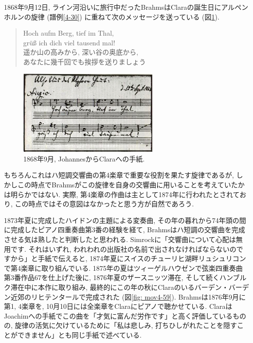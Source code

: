 1868年9月12日, ライン河沿いに旅行中だったBrahms\cite{compos}はClaraの誕生日にアルペンホルンの旋律
(譜例\ref{4-30}) に重ねて次のメッセージを送っている (図\ref{fig: alphorn}).
\begin{quote}
\begin{multicols}{2}
	Hoch aufm Berg, tief im Thal, \\
	grüß ich dich viel tausend mal! \\
	遥か山の高みから, 深い谷の奥底から, \\
	あなたに幾千回でも挨拶を送りましょう
\end{multicols}
\end{quote}
\begin{figure}
	\centering
    \includegraphics[clip,width=7.0cm]{./figure/alphorn.jpg}
	\caption{1868年9月, JohannesからClaraへの手紙.}
    \label{fig: alphorn}
\end{figure}

\noindent もちろんこれはハ短調交響曲の第4楽章で重要な役割を果たす旋律であるが,
しかしこの時点でBrahmsがこの旋律を自身の交響曲に用いることを考えていたかは明らかではない.
実際, 第4楽章の作曲は主として1874年に行われたとされており, この時点ではその意図はなかったと思う方が自然であろう\cite{frisch}.

1873年夏に完成したハイドンの主題による変奏曲, その年の暮れから74年頭の間に完成したピアノ四重奏曲第3番の経験を経て, Brahmsはハ短調の交響曲を完成させる気は熟したと判断したと思われる.
Simrockに「交響曲について心配は無用です. それはいずれ, われわれの出版社の名前で出されなければならないのですから」と手紙で伝える\cite{ogt}と,
1874年夏にスイスのチューリヒ湖畔リュシュリコンで第4楽章に取り組んでいる.
1875年の夏はツィーゲルハウゼンで弦楽四重奏曲第3番作品67を仕上げた\cite{compos}後に, 1876年夏のザースニッツ滞在,
そして続くハンブルク滞在中に本作に取り組み, 最終的にこの年の秋にClaraのいるバーデン・バーデン近郊のリヒテンタールで完成された (図\ref{fig: mov4-59}).
Brahmsは1876年9月に第1, 4楽章を, 10月10日には全楽章をClaraにピアノで聴かせている.
ClaraはJoachimへの手紙でこの曲を「才気に富んだ労作です」と高く評価しているものの, 旋律の活気に欠けているために「私は悲しみ,
打ちひしがれたことを隠すことができません」とも同じ手紙で述べている\cite{compos}.

